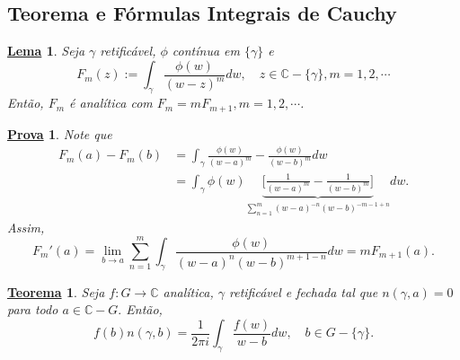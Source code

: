 \documentclass{article}
\newtheorem*{theorem*}{\underline{Teorema}}
\newtheorem*{proof*}{\underline{Prova}}
\newtheorem*{lmm*}{\underline{Lema}}
\begin{document}
\subsection{Teorema e F\'ormulas Integrais de Cauchy}
\begin{lmm*}
  Seja $\gamma$ retific\'avel, $\phi$ cont\'inua em $\{\gamma\} $ e 
  $$
  F_{m}(z):= \int_{\gamma}^{}\frac{\phi(w)}{(w-z)^{m}}dw, \quad z\in \mathbb{C}-\{\gamma\}, m=1, 2, \cdots
  $$
  Ent\~ao, $F_{m}$ \'e anal\'itica com $F_{m} = mF_{m+1}, m = 1, 2, \cdots$.
\end{lmm*}
\begin{proof*}
  Note que 
  \begin{align*}
    F_{m}(a) - F_{m}(b) &= \int_{\gamma}^{}\frac{\phi(w)}{(w-a)^{m}} - \frac{\phi(w)}{(w-b)^{m}}dw \\
                        &= \int_{\gamma}^{}\phi(w)\underbrace{\biggl[\frac{1}{(w-a)^{m}} - \frac{1}{(w-b)^{m}}\biggr]}_{\sum\limits_{n=1}^{m}(w-a)^{-n}(w-b)^{-m-1+n}}dw.
  \end{align*}
  Assim,
  $$
  F_{m}'(a) = \lim_{b\to{a}}\sum\limits_{n=1}^{m}\int_{\gamma}^{}\frac{\phi(w)}{(w-a)^{n}(w-b)^{m+1-n}}dw = mF_{m+1}(a).
  $$
\end{proof*}
\begin{theorem*}
  Seja $f:G\rightarrow \mathbb{C}$ anal\'itica, $\gamma$ retific\'avel e fechada tal que $n(\gamma, a) = 0$ para todo $a\in \mathbb{C}-G.$
Ent\~ao, 
  $$
    f(b)n(\gamma, b) = \frac{1}{2\pi i}\int_{\gamma}^{}\frac{f(w)}{w-b}dw, \quad b\in{G-\{\gamma\}}.
  $$
\end{theorem*}
\end{document}
